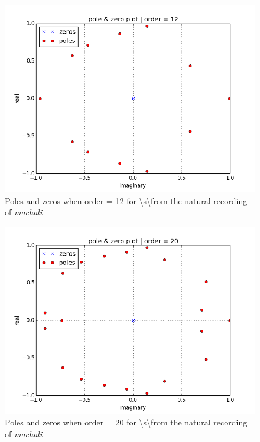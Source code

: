 \documentclass[a4paper]{article}
\begin{document}
\begin{figure}[h!]
    \includegraphics[width=\linewidth]{./images/s_pole-zero_12_.png}
    \caption{Poles and zeros when order = 12 for \textbackslash s\textbackslash from the natural recording of \textit{machali}}
    \label{fig:1}
\end{figure}


\begin{figure}[h!]
    \includegraphics[width=\linewidth]{./images/s_pole-zero_20_.png}
    \caption{ Poles and zeros when order = 20 for \textbackslash s\textbackslash from the natural recording of \textit{machali}}
    \label{fig:1}
\end{figure}
\end{document}
